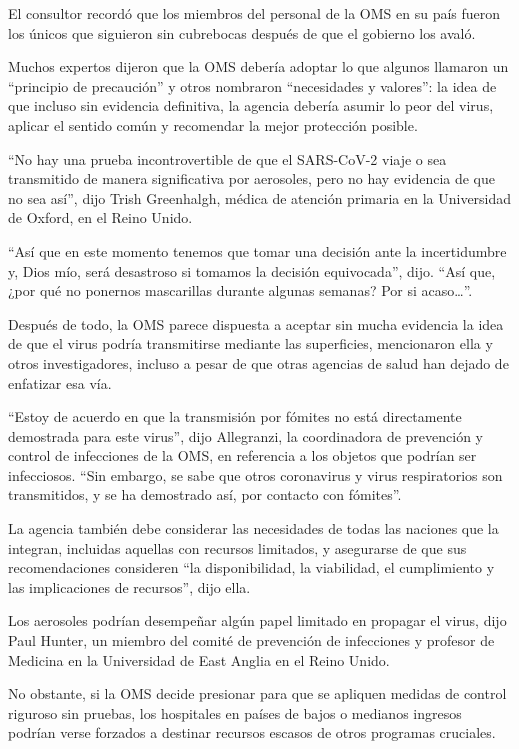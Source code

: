 El consultor recordó que los miembros del personal de la OMS en su país
fueron los únicos que siguieron sin cubrebocas después de que el
gobierno los avaló.

Muchos expertos dijeron que la OMS debería adoptar lo que algunos
llamaron un ``principio de precaución'' y otros nombraron ``necesidades
y valores'': la idea de que incluso sin evidencia definitiva, la agencia
debería asumir lo peor del virus, aplicar el sentido común y recomendar
la mejor protección posible.

``No hay una prueba incontrovertible de que el SARS-CoV-2 viaje o sea
transmitido de manera significativa por aerosoles, pero no hay evidencia
de que no sea así'', dijo Trish Greenhalgh, médica de atención primaria
en la Universidad de Oxford, en el Reino Unido.

``Así que en este momento tenemos que tomar una decisión ante la
incertidumbre y, Dios mío, será desastroso si tomamos la decisión
equivocada'', dijo. ``Así que, ¿por qué no ponernos mascarillas durante
algunas semanas? Por si acaso\ldots{}''.

Después de todo, la OMS parece dispuesta a aceptar sin mucha evidencia
la idea de que el virus podría transmitirse mediante las superficies,
mencionaron ella y otros investigadores, incluso a pesar de que otras
agencias de salud han dejado de enfatizar esa vía.

``Estoy de acuerdo en que la transmisión por fómites no está
directamente demostrada para este virus'', dijo Allegranzi, la
coordinadora de prevención y control de infecciones de la OMS, en
referencia a los objetos que podrían ser infecciosos. ``Sin embargo, se
sabe que otros coronavirus y virus respiratorios son transmitidos, y se
ha demostrado así, por contacto con fómites''.

La agencia también debe considerar las necesidades de todas las naciones
que la integran, incluidas aquellas con recursos limitados, y asegurarse
de que sus recomendaciones consideren ``la disponibilidad, la
viabilidad, el cumplimiento y las implicaciones de recursos'', dijo
ella.

Los aerosoles podrían desempeñar algún papel limitado en propagar el
virus, dijo Paul Hunter, un miembro del comité de prevención de
infecciones y profesor de Medicina en la Universidad de East Anglia en
el Reino Unido.

No obstante, si la OMS decide presionar para que se apliquen medidas de
control riguroso sin pruebas, los hospitales en países de bajos o
medianos ingresos podrían verse forzados a destinar recursos escasos de
otros programas cruciales.

